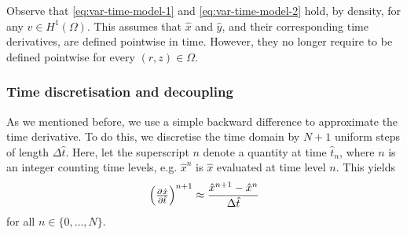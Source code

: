 \documentclass[11pt]{article}
\numberwithin{equation}{section}
\begin{document}
Observe that \eqref{eq:var-time-model-1} and \eqref{eq:var-time-model-2} hold, by density, for any \(v \in H^1(\Omega)\). This assumes that \(\hat x\) and \(\hat y\), and their corresponding time derivatives, are defined pointwise in time. However, they no longer require to be defined pointwise for every \( (r,z) \in \Omega\).



\subsubsection{Time discretisation and decoupling}

As we mentioned before, we use a simple backward difference to approximate the time derivative.
To do this, we discretise the time domain by \(N+1\) uniform steps of length \(\Delta \hat{t}\). Here, let the superscript $n$ denote a quantity at time $\hat t_n$, where $n$ is an integer counting time levels, e.g. $\hat{x}^n$ is $\hat{x}$ evaluated at time level $n$. This yields
\begin{equation}
    \left(\pd{ \hat x}{\hat t}\right)^{n+1} \approx \frac{ \hat{x}^{n+1} - \hat{x}^n}{\Delta \hat t}
\end{equation}
for all \( n \in \{0,\ldots, N \}\).
\end{document}
